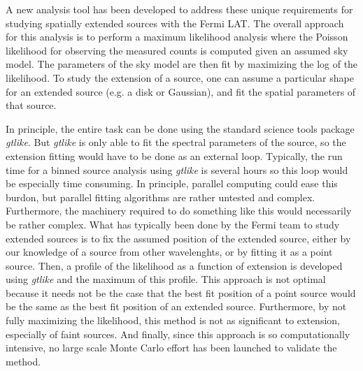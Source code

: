 \documentclass{emulateapj}
\begin{document}
A new analysis tool has been developed to address these unique
requirements for studying spatially extended sources with the Fermi
LAT. The overall approach for this analysis is to perform a maximum
likelihood analysis where the Poisson likelihood for observing the
measured counts is computed given an assumed sky model. The parameters
of the sky model are then fit by maximizing the log of the likelihood.
To study the extension of a source, one can assume a particular shape
for an extended source (e.g. a disk or Gaussian), and fit the spatial
parameters of that source.

In principle, the entire task can be done using the standard science
tools package {\em gtlike}\cite{Science-Tools-gtlike}. But {\em gtlike} is
only able to fit the spectral parameters of the source, so the extension
fitting would have to be done as an external loop. Typically, the run time
for a binned source analysis using {\em gtlike} is several hours so this loop
would be especially time consuming. In principle, parallel computing could
ease this burdon, but parallel fitting algorithms are rather untested
and complex. Furthermore, the machinery required to do something like
this would necessarily be rather complex. What has typically been done by
the Fermi team to study extended sources is to fix the assumed position
of the extended source, either by our knowledge of a source from other
wavelenghts, or by fitting it as a point source. Then, a profile of the
likelihood as a function of extension is developed using {\em gtlike}
and the maximum of this profile. This approach is not optimal because it
needs not be the case that the best fit position of a point source would
be the same as the best fit position of an extended source. Furthermore,
by not fully maximizing the likelihood, this method is not as significant to
extension, especially of faint sources. And finally, since this approach
is so computationally intensive, no large scale Monte Carlo effort has been
launched to validate the method.
\end{document}
